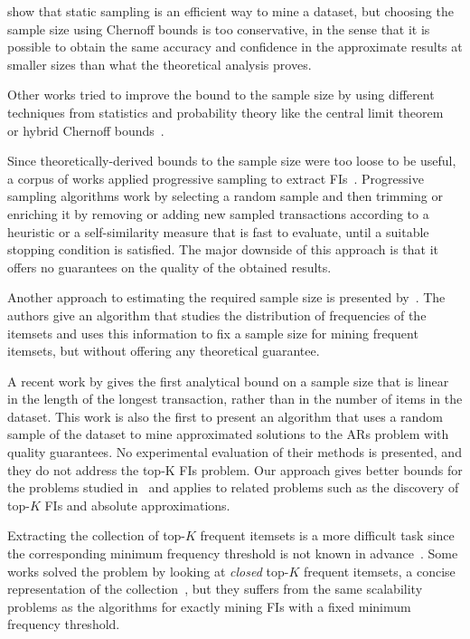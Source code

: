 \citet{ZakiPLO97} show that static sampling is an efficient way to
mine a dataset, but choosing the sample size using Chernoff bounds is too
conservative, in the sense that it is possible to obtain the same accuracy and
confidence in the approximate results at smaller sizes than what the theoretical
analysis proves. 

Other works tried to improve the bound to the sample size by using different
techniques from statistics and probability theory like the central limit
theorem~\citep{ZhangZW03,LiG04,JiaL05} or hybrid Chernoff
bounds~\citep{ZhaoZZ06}.

Since theoretically-derived bounds to the sample size were too loose to be
useful, a corpus of works applied progressive sampling to extract
FIs~\citep{JohnL96,ChenHS02,Parthasarathy02,BronnimanCDHS03,ChuangCY05,JiaG05,WangDC05,HwangK06,HuY06,MahafzahABAZ09,ChenHH11,ChandraB11}.
Progressive sampling algorithms work by selecting a random sample and then
trimming or enriching it by removing or adding new sampled transactions
according to a heuristic or a self-similarity measure that is fast to evaluate,
until a suitable stopping condition is satisfied. The major downside of this
approach is that it offers no guarantees on the quality of the obtained results.

Another approach to estimating the required sample size is presented
by~\citet{ChuangHC08}. The authors give an algorithm that studies the
distribution of frequencies of the itemsets and uses this information to fix a
sample size for mining frequent itemsets, but without offering any theoretical
guarantee.

A recent work by \citet{ChakaravarthyPS09} gives the first
analytical bound on a sample size that is linear in the length of the longest
transaction, rather than in the number of items in the dataset.  This work is
also the first to present an algorithm that uses a random sample of the dataset
to mine approximated solutions to the ARs problem with quality guarantees. No
experimental evaluation of their methods is presented, and they do not address
the top-K FIs problem. Our approach gives better bounds for the problems
studied in~\citep{ChakaravarthyPS09} and applies to related problems such as the
discovery of top-$K$ FIs and absolute approximations.

Extracting the collection of top-$K$ frequent itemsets is a more difficult task
since the corresponding minimum frequency threshold is not known in
advance~\citep{CheungF04,FuKT00}. Some works solved the problem by looking at
\emph{closed} top-$K$ frequent itemsets, a concise representation of the
collection~\citep{WangHLT05,PietracaprinaV07}, but they suffers from the same
scalability problems as the algorithms for exactly mining FIs with a fixed
minimum frequency threshold.

